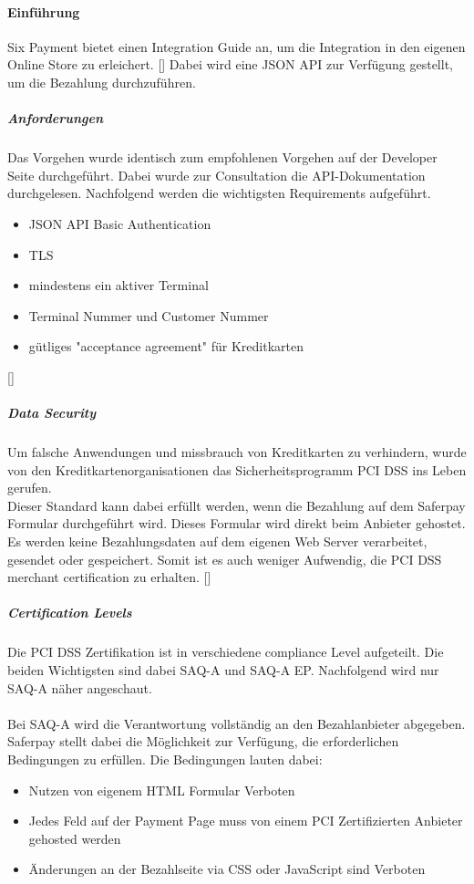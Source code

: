 \paragraph{Einführung}
Six Payment bietet einen Integration Guide an, um die Integration in den eigenen Online Store zu erleichert. [\cite{sixECommerce}] Dabei wird eine JSON API zur Verfügung gestellt, um die Bezahlung durchzuführen. 
\subparagraph{Anforderungen}
Das Vorgehen wurde identisch zum empfohlenen Vorgehen auf der Developer Seite durchgeführt. Dabei wurde zur Consultation die API-Dokumentation durchgelesen. Nachfolgend werden die wichtigsten Requirements aufgeführt. 
\begin{itemize}
	\item JSON API Basic Authentication
	\item TLS 
	\item mindestens ein aktiver Terminal
	\item Terminal Nummer und Customer Nummer
	\item gütliges "acceptance agreement" für Kreditkarten
\end{itemize} 
[\cite{jsonAPISix}]
\subparagraph{Data Security}
Um falsche Anwendungen und missbrauch von Kreditkarten zu verhindern, wurde von den Kreditkartenorganisationen das Sicherheitsprogramm \ac{PCI DSS} ins Leben gerufen. \\
Dieser Standard kann dabei erfüllt werden, wenn die Bezahlung auf dem Saferpay Formular durchgeführt wird. Dieses Formular wird direkt beim Anbieter gehostet. Es werden keine Bezahlungsdaten auf dem eigenen Web Server verarbeitet, gesendet oder gespeichert. Somit ist es auch weniger Aufwendig, die PCI DSS merchant certification zu erhalten. [\cite{jsonAPISix}]

\subparagraph{Certification Levels}
Die \ac{PCI DSS} Zertifikation ist in verschiedene compliance Level aufgeteilt. Die beiden Wichtigsten sind dabei \ac{SAQ}-A und \ac{SAQ}-A EP. Nachfolgend wird nur \ac{SAQ}-A näher angeschaut. \\\\
Bei \ac{SAQ}-A wird die Verantwortung vollständig an den Bezahlanbieter abgegeben. Saferpay stellt dabei die Möglichkeit zur Verfügung, die erforderlichen Bedingungen zu erfüllen. Die Bedingungen lauten dabei: 
\begin{itemize}
	\item Nutzen von eigenem HTML Formular Verboten
	\item Jedes Feld auf der Payment Page muss von einem PCI Zertifizierten Anbieter gehosted werden
	\item Änderungen an der Bezahlseite via CSS oder JavaScript sind Verboten
\end{itemize}

